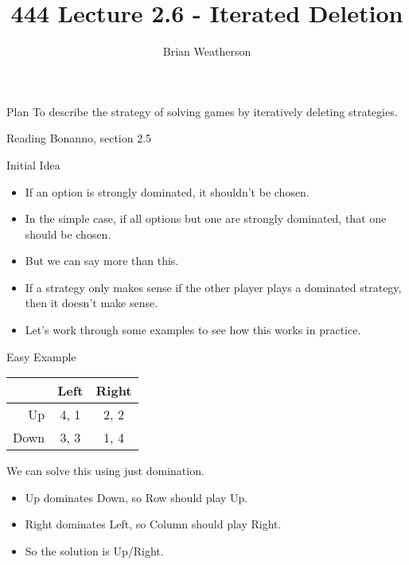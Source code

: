 \documentclass[
  ignorenonframetext,
]{beamer}
\title{444 Lecture 2.6 - Iterated Deletion}
\author{Brian Weatherson}
\date{}
\providecommand{\tightlist}{%
  \setlength{\itemsep}{0pt}\setlength{\parskip}{0pt}}
\begin{document}
\frame{\titlepage}

\begin{frame}{Plan}
\protect\hypertarget{plan}{}
To describe the strategy of solving games by iteratively deleting
strategies.
\end{frame}

\begin{frame}{Reading}
\protect\hypertarget{reading}{}
Bonanno, section 2.5
\end{frame}

\begin{frame}{Initial Idea}
\protect\hypertarget{initial-idea}{}
\begin{itemize}[<+->]
\tightlist
\item
  If an option is strongly dominated, it shouldn't be chosen.
\item
  In the simple case, if all options but one are strongly dominated,
  that one should be chosen.
\item
  But we can say more than this.
\item
  If a strategy only makes sense if the other player plays a dominated
  strategy, then it doesn't make sense.
\item
  Let's work through some examples to see how this works in practice.
\end{itemize}
\end{frame}

\begin{frame}{Easy Example}
\protect\hypertarget{easy-example}{}
\begin{table}[!h]
\centering
\begin{tabular}[t]{>{}r|cc}
\toprule
 & Left & Right\\
\midrule
Up & 4, 1 & 2, 2\\
Down & 3, 3 & 1, 4\\
\bottomrule
\end{tabular}
\end{table}

We can solve this using just domination.

\begin{itemize}[<+->]
\tightlist
\item
  Up dominates Down, so Row should play Up.
\item
  Right dominates Left, so Column should play Right.
\item
  So the solution is Up/Right.
\end{itemize}
\end{frame}
\end{document}
